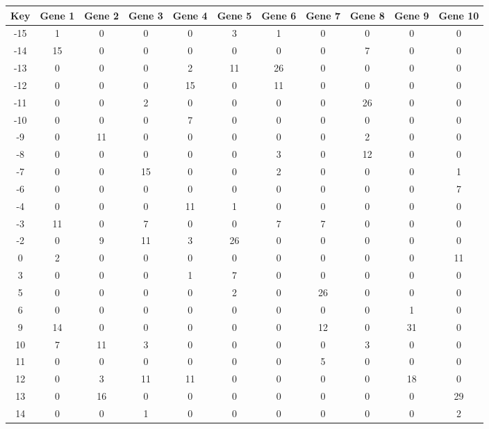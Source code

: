 \begin{tabular}{|c|c|c|c|c|c|c|c|c|c|c|}
\hline
Key & Gene 1 & Gene 2 & Gene 3 & Gene 4 & Gene 5 & Gene 6 & Gene 7 & Gene 8 & Gene 9 & Gene 10 \\
\hline
-15 & 1 & 0 & 0 & 0 & 3 & 1 & 0 & 0 & 0 & 0 \\
-14 & 15 & 0 & 0 & 0 & 0 & 0 & 0 & 7 & 0 & 0 \\
-13 & 0 & 0 & 0 & 2 & 11 & 26 & 0 & 0 & 0 & 0 \\
-12 & 0 & 0 & 0 & 15 & 0 & 11 & 0 & 0 & 0 & 0 \\
-11 & 0 & 0 & 2 & 0 & 0 & 0 & 0 & 26 & 0 & 0 \\
-10 & 0 & 0 & 0 & 7 & 0 & 0 & 0 & 0 & 0 & 0 \\
-9 & 0 & 11 & 0 & 0 & 0 & 0 & 0 & 2 & 0 & 0 \\
-8 & 0 & 0 & 0 & 0 & 0 & 3 & 0 & 12 & 0 & 0 \\
-7 & 0 & 0 & 15 & 0 & 0 & 2 & 0 & 0 & 0 & 1 \\
-6 & 0 & 0 & 0 & 0 & 0 & 0 & 0 & 0 & 0 & 7 \\
-4 & 0 & 0 & 0 & 11 & 1 & 0 & 0 & 0 & 0 & 0 \\
-3 & 11 & 0 & 7 & 0 & 0 & 7 & 7 & 0 & 0 & 0 \\
-2 & 0 & 9 & 11 & 3 & 26 & 0 & 0 & 0 & 0 & 0 \\
0 & 2 & 0 & 0 & 0 & 0 & 0 & 0 & 0 & 0 & 11 \\
3 & 0 & 0 & 0 & 1 & 7 & 0 & 0 & 0 & 0 & 0 \\
5 & 0 & 0 & 0 & 0 & 2 & 0 & 26 & 0 & 0 & 0 \\
6 & 0 & 0 & 0 & 0 & 0 & 0 & 0 & 0 & 1 & 0 \\
9 & 14 & 0 & 0 & 0 & 0 & 0 & 12 & 0 & 31 & 0 \\
10 & 7 & 11 & 3 & 0 & 0 & 0 & 0 & 3 & 0 & 0 \\
11 & 0 & 0 & 0 & 0 & 0 & 0 & 5 & 0 & 0 & 0 \\
12 & 0 & 3 & 11 & 11 & 0 & 0 & 0 & 0 & 18 & 0 \\
13 & 0 & 16 & 0 & 0 & 0 & 0 & 0 & 0 & 0 & 29 \\
14 & 0 & 0 & 1 & 0 & 0 & 0 & 0 & 0 & 0 & 2 \\
\hline
\end{tabular}
